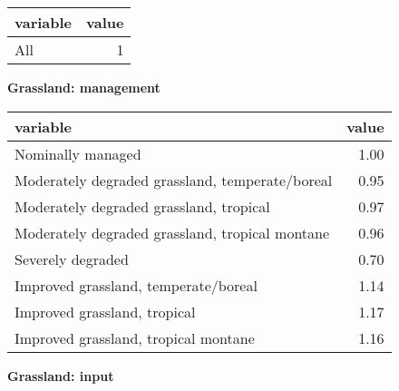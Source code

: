 \documentclass[
]{article}
\newenvironment{Shaded}{\begin{snugshade}}{\end{snugshade}}
\newcommand{\AttributeTok}[1]{\textcolor[rgb]{0.77,0.63,0.00}{#1}}
\newcommand{\DecValTok}[1]{\textcolor[rgb]{0.00,0.00,0.81}{#1}}
\newcommand{\FunctionTok}[1]{\textcolor[rgb]{0.00,0.00,0.00}{#1}}
\newcommand{\NormalTok}[1]{#1}
\newcommand{\OtherTok}[1]{\textcolor[rgb]{0.56,0.35,0.01}{#1}}
\newcommand{\SpecialCharTok}[1]{\textcolor[rgb]{0.00,0.00,0.00}{#1}}
\begin{document}
\begin{longtable}[]{@{}lr@{}}
\toprule()
variable & value \\
\midrule()
\endhead
All & 1 \\
\bottomrule()
\end{longtable}

\textbf{Grassland: management}

\begin{Shaded}
\end{Shaded}

\begin{longtable}[]{@{}lr@{}}
\toprule()
variable & value \\
\midrule()
\endhead
Nominally managed & 1.00 \\
Moderately degraded grassland, temperate/boreal & 0.95 \\
Moderately degraded grassland, tropical & 0.97 \\
Moderately degraded grassland, tropical montane & 0.96 \\
Severely degraded & 0.70 \\
Improved grassland, temperate/boreal & 1.14 \\
Improved grassland, tropical & 1.17 \\
Improved grassland, tropical montane & 1.16 \\
\bottomrule()
\end{longtable}

\textbf{Grassland: input}

\begin{Shaded}
\end{Shaded}
\end{document}
